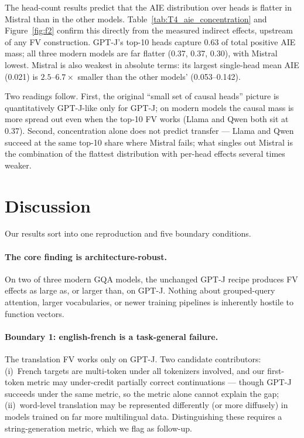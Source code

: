 \documentclass[11pt]{article}
\begin{document}
The head-count results predict that the AIE distribution over heads is
flatter in Mistral than in the other models.
Table~\ref{tab:T4_aie_concentration} and Figure~\ref{fig:f2} confirm this
directly from the measured indirect effects, upstream of any FV
construction. GPT-J's top-10 heads capture 0.63 of total positive AIE mass;
all three modern models are far flatter (0.37, 0.37, 0.30), with Mistral
lowest. Mistral is also weakest in absolute terms: its largest single-head
mean AIE (0.021) is $2.5$--$6.7\times$ smaller than the other models'
(0.053--0.142).

Two readings follow. First, the original ``small set of causal heads''
picture is quantitatively GPT-J-like only for GPT-J; on modern models the
causal mass is more spread out even when the top-10 FV works (Llama and
Qwen both sit at 0.37). Second, concentration alone does not predict
transfer --- Llama and Qwen succeed at the same top-10 share where Mistral
fails; what singles out Mistral is the combination of the flattest
distribution with per-head effects several times weaker.



\section{Discussion}
\label{sec:discussion}

Our results sort into one reproduction and five boundary conditions.

\paragraph{The core finding is architecture-robust.} On two of three
modern GQA models, the unchanged GPT-J recipe produces FV effects as large
as, or larger than, on GPT-J. Nothing about grouped-query attention,
larger vocabularies, or newer training pipelines is inherently hostile to
function vectors.

\paragraph{Boundary 1: english-french is a task-general failure.} The
translation FV works only on GPT-J. Two candidate contributors: (i)~French
targets are multi-token under all tokenizers involved, and our first-token
metric may under-credit partially correct continuations --- though GPT-J
succeeds under the same metric, so the metric alone cannot explain the gap;
(ii)~word-level translation may be represented differently (or more
diffusely) in models trained on far more multilingual data. Distinguishing
these requires a string-generation metric, which we flag as follow-up.
\end{document}
